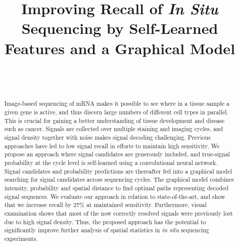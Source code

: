 \documentclass[10pt,journal]{IEEEtran}
\begin{document}
\title{Improving Recall of \textit{In Situ} Sequencing by Self-Learned Features and a Graphical Model}


\author{\\
\\
}


\maketitle


\begin{abstract}
Image-based sequencing of mRNA makes it possible to see where in a tissue sample a given gene is active, and thus discern large numbers of different cell types in parallel. This is crucial for gaining a better understanding of tissue development and disease such as cancer. Signals are collected over multiple staining and imaging cycles, and signal density together with noise makes signal decoding challenging. Previous approaches have led to low signal recall in efforts to maintain high sensitivity. We propose an approach where signal candidates are generously included, and true-signal probability at the cycle level is self-learned using a convolutional neural network. Signal candidates and probability predictions are thereafter fed into a graphical model searching for signal candidates across sequencing cycles. The graphical model combines intensity, probability and spatial distance to find optimal paths representing decoded signal sequences. We evaluate our approach in relation to state-of-the-art, and show that we increase recall by $27\%$  at maintained sensitivity. Furthermore, visual examination shows that most of the now correctly resolved signals were previously lost due to high signal density. Thus, the proposed approach has the potential to significantly improve further analysis of spatial statistics in \textit{in situ} sequencing experiments.

\end{abstract}
\end{document}
